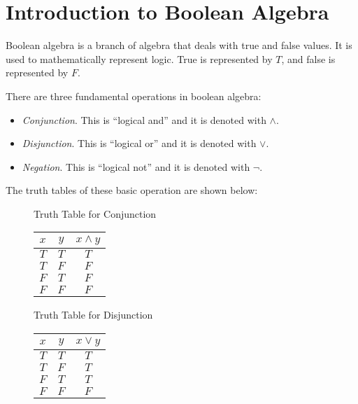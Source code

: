 
\section{Introduction to Boolean Algebra}

Boolean algebra is a branch of algebra that deals with true and false values. It is used to mathematically represent logic.
True is represented by \(T\), and false is represented by \(F\).

There are three fundamental operations in boolean algebra:
\begin{itemize}
    \item \emph{Conjunction}. This is ``logical and'' and it is denoted with \(\land\).
    \item \emph{Disjunction}. This is ``logical or'' and it is denoted with \(\lor\).
    \item \emph{Negation}. This is ``logical not'' and it is denoted with \(\lnot\).
\end{itemize}

The truth tables of these basic operation are shown below:

\begin{figure}[H]
    \centering
    Truth Table for Conjunction

    \begin{tabular}{ccc}
        \(x\) & \(y\) & \(x\land y\) \\
        \hline
        \(T\) & \(T\) & \(T\) \\
        \(T\) & \(F\) & \(F\) \\
        \(F\) & \(T\) & \(F\) \\
        \(F\) & \(F\) & \(F\)
    \end{tabular}
\end{figure}

\begin{figure}[H]
    \centering
    Truth Table for Disjunction

    \begin{tabular}{ccc}
        \(x\) & \(y\) & \(x\lor y\) \\
        \hline
        \(T\) & \(T\) & \(T\) \\
        \(T\) & \(F\) & \(T\) \\
        \(F\) & \(T\) & \(T\) \\
        \(F\) & \(F\) & \(F\)
    \end{tabular}
\end{figure}

